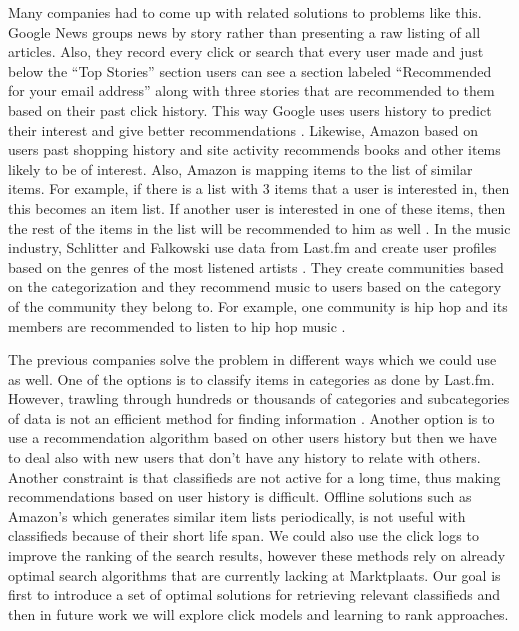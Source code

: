 Many companies had to come up with related solutions to problems like this. Google News groups news by story rather than presenting a raw listing of all articles. Also, they record every click or search that every user made and just below the ``Top Stories'' section users can see a section labeled ``Recommended for your email address'' along with three stories that are recommended to them based on their past click history. This way Google uses users history to predict their interest and give better recommendations \cite{AbhinandanGoogle}. Likewise, Amazon based on users past shopping history and site activity recommends books and other items likely to be of interest. Also, Amazon is mapping items to the list of similar items. For example, if there is a list with 3 items that a user is interested in, then this becomes an item list. If another user is interested in one of these items, then the rest of the items in the list will be recommended to him as well \cite{LindenJacobiBenson}. In the music industry, Schlitter and Falkowski use data from Last.fm and create user profiles based on the genres of the most listened artists \cite{SchlitterFalkowski}. They create communities based on the categorization and they recommend music to users based on the category of the community they belong to. For example, one community is hip hop and its members are recommended to listen to hip hop music \cite{OwenAnil}.

The previous companies solve the problem in different ways which we could use as well. One of the options is to classify items in categories as done by Last.fm. However, trawling through hundreds or thousands of categories and subcategories of data is not an efficient method for finding information \cite{HatcherMcCandless}.  Another option is to use a recommendation algorithm based on other users history but then we have to deal also with new users that don't have any history to relate with others. Another constraint is that classifieds are not active for a long time, thus making recommendations based on user history is difficult. Offline solutions such as Amazon's which generates similar item lists periodically, is not useful with classifieds because of their short life span. We could also use the click logs to improve the ranking of the search results, however these methods rely on already optimal search algorithms that are currently lacking at Marktplaats. Our goal is first to introduce a set of optimal solutions for retrieving relevant classifieds and then in future work we will explore click models and learning to rank approaches.

